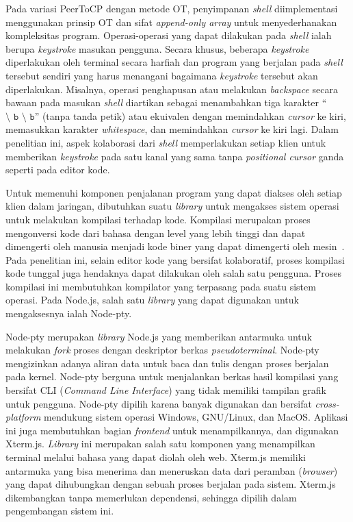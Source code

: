 Pada variasi PeerToCP dengan metode OT, penyimpanan \textit{shell} diimplementasi menggunakan prinsip OT dan sifat \textit{append-only array} untuk menyederhanakan kompleksitas program. Operasi-operasi yang dapat dilakukan pada \textit{shell} ialah berupa \textit{keystroke} masukan pengguna. Secara khusus, beberapa \textit{keystroke} diperlakukan oleh terminal secara harfiah dan program yang berjalan pada \textit{shell} tersebut sendiri yang harus menangani bagaimana \textit{keystroke} tersebut akan diperlakukan. Misalnya, operasi penghapusan atau melakukan \textit{backspace} secara bawaan pada masukan \textit{shell} diartikan sebagai menambahkan tiga karakter ``$\texttt{\char`\\ b \char`\\ b}$'' (tanpa tanda petik) atau ekuivalen dengan memindahkan \textit{cursor} ke kiri, memasukkan karakter \textit{whitespace}, dan memindahkan \textit{cursor} ke kiri lagi. Dalam penelitian ini, aspek kolaborasi dari \textit{shell} memperlakukan setiap klien untuk memberikan \textit{keystroke} pada satu kanal yang sama tanpa \textit{positional cursor} ganda seperti pada editor kode.

Untuk memenuhi komponen penjalanan program yang dapat diakses oleh setiap klien dalam jaringan, dibutuhkan suatu \textit{library} untuk mengakses sistem operasi untuk melakukan kompilasi terhadap kode. Kompilasi merupakan proses mengonversi kode dari bahasa dengan level yang lebih tinggi dan dapat dimengerti oleh manusia menjadi kode biner yang dapat dimengerti oleh mesin~\citep{aho1985compilers}. Pada penelitian ini, selain editor kode yang bersifat kolaboratif, proses kompilasi kode tunggal juga hendaknya dapat dilakukan oleh salah satu pengguna. Proses kompilasi ini membutuhkan kompilator yang terpasang pada suatu sistem operasi. Pada Node.js, salah satu \textit{library} yang dapat digunakan untuk mengaksesnya ialah Node-pty.

Node-pty merupakan \textit{library} Node.js yang memberikan antarmuka untuk melakukan \textit{fork} proses dengan deskriptor berkas \textit{pseudoterminal}. Node-pty mengizinkan adanya aliran data untuk baca dan tulis dengan proses berjalan pada kernel. Node-pty berguna untuk menjalankan berkas hasil kompilasi yang bersifat CLI (\textit{Command Line Interface}) yang tidak memiliki tampilan grafik untuk pengguna. Node-pty dipilih karena banyak digunakan dan bersifat \textit{cross-platform} mendukung sistem operasi Windows, GNU/Linux, dan MacOS. Aplikasi ini juga membutuhkan bagian \textit{frontend} untuk menampilkannya, dan digunakan Xterm.js. \textit{Library} ini merupakan salah satu komponen yang menampilkan terminal melalui bahasa yang dapat diolah oleh web. Xterm.js memiliki antarmuka yang bisa menerima dan meneruskan data dari peramban (\textit{browser}) yang dapat dihubungkan dengan sebuah proses berjalan pada sistem. Xterm.js dikembangkan tanpa memerlukan dependensi, sehingga dipilih dalam pengembangan sistem ini.


